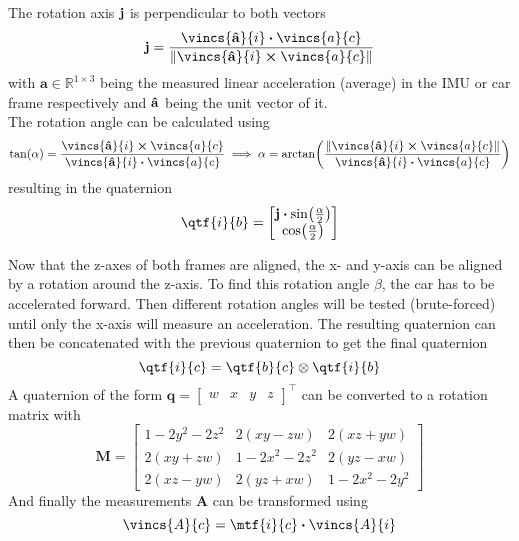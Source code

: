 The rotation axis $\vb{j}$ is perpendicular to both vectors
\begin{equation}
    \vb{j} = \frac{\vincs{\vu{a}}{i} \vdot \vincs{a}{c}}{\norm{\vincs{\vu{a}}{i} \cp \vincs{a}{c}}}
\end{equation}
with $\mathbf{a} \in \mathbb{R}^{1\times3}$ being the measured linear acceleration (average) in the IMU or car frame respectively and $\vu{a}$ being the unit vector of it.\\
The rotation angle can be calculated using
\begin{equation}
    \tan(\alpha) = \frac{\vincs{\vu{a}}{i} \cp \vincs{a}{c}}{\vincs{\vu{a}}{i} \vdot \vincs{a}{c}} \implies
    \alpha = \arctan(\frac{\norm{\vincs{\vu{a}}{i} \cp \vincs{a}{c}}}{\vincs{\vu{a}}{i} \vdot \vincs{a}{c}})
\end{equation}
resulting in the quaternion
\begin{equation}
    \qtf{i}{b} =
    \begin{bmatrix}
        \vb{j}\vdot\sin(\frac{\alpha}{2}) \\
        \cos(\frac{\alpha}{2})
    \end{bmatrix}
\end{equation}

Now that the z-axes of both frames are aligned, the x- and y-axis can be aligned by a rotation around the z-axis.
To find this rotation angle $\beta$, the car has to be accelerated forward.
Then different rotation angles will be tested (brute-forced) until only the x-axis will measure an acceleration.
The resulting quaternion  can then be concatenated with the previous quaternion to get the final quaternion
\begin{equation}
    \qtf{i}{c} = \qtf{b}{c} \otimes  \qtf{i}{b}
\end{equation}
A quaternion of the form
$\mathbf{q} = \left[\begin{array}{llll} w & x & y & z \end{array}\right]^{\top}$
can be converted to a rotation matrix with
\begin{equation}
    \mathbf{M} =
    \left[
        \begin{array}{ccc}
            1-2 y^{2}-2 z^{2} & 2(x y-z w) & 2(x z+y w) \\
            2(x y+z w) & 1-2 x^{2}-2 z^{2} & 2(y z-x w) \\
            2(x z-y w) & 2(y z+x w) & 1-2 x^{2}-2 y^{2}
        \end{array}
        \right]
    \end{equation}
And finally the measurements $\mathbf{A}$ can be transformed using
\begin{equation}
    \vincs{A}{c} = \mtf{i}{c} \vdot \vincs{A}{i}
\end{equation}

